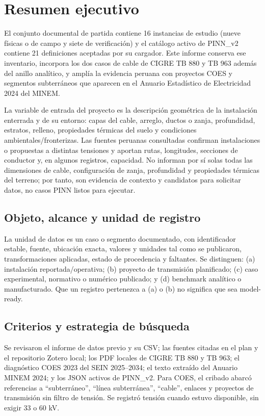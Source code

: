 \documentclass[11pt,a4paper,oneside]{report}
\begin{document}

\chapter*{Resumen ejecutivo}
El conjunto documental de partida contiene 16 instancias de estudio (nueve f\'isicas o de campo y siete de verificaci\'on) y el cat\'alogo activo de PINN\_v2 contiene 21 definiciones aceptadas por su cargador. Este informe conserva ese inventario, incorpora los dos casos de cable de CIGRE TB 880 y TB 963 adem\'as del anillo anal\'itico, y ampl\'ia la evidencia peruana con proyectos COES y segmentos subterr\'aneos que aparecen en el Anuario Estad\'istico de Electricidad 2024 del MINEM.

La variable de entrada del proyecto es la descripci\'on geom\'etrica de la instalaci\'on enterrada y de su entorno: capas del cable, arreglo, ductos o zanja, profundidad, estratos, relleno, propiedades t\'ermicas del suelo y condiciones ambientales/fronterizas. Las fuentes peruanas consultadas confirman instalaciones o propuestas a distintas tensiones y aportan rutas, longitudes, secciones de conductor y, en algunos registros, capacidad. No informan por s\'i solas todas las dimensiones de cable, configuraci\'on de zanja, profundidad y propiedades t\'ermicas del terreno; por tanto, son evidencia de contexto y candidatos para solicitar datos, no casos PINN listos para ejecutar.

\section*{Objeto, alcance y unidad de registro}
La unidad de datos es un caso o segmento documentado, con identificador estable, fuente, ubicaci\'on exacta, valores y unidades tal como se publicaron, transformaciones aplicadas, estado de procedencia y faltantes. Se distinguen: (a) instalaci\'on reportada/operativa; (b) proyecto de transmisi\'on planificado; (c) caso experimental, normativo o num\'erico publicado; y (d) benchmark anal\'itico o manufacturado. Que un registro pertenezca a (a) o (b) no significa que sea model-ready.

\section*{Criterios y estrategia de b\'usqueda}
Se revisaron el informe de datos previo y su CSV; las fuentes citadas en el plan y el repositorio Zotero local; los PDF locales de CIGRE TB 880 y TB 963; el diagn\'ostico COES 2023 del SEIN 2025--2034; el texto extra\'ido del Anuario MINEM 2024; y los JSON activos de PINN\_v2. Para COES, el cribado abarc\'o referencias a ``subterr\'aneo'', ``l\'inea subterr\'anea'', ``cable'', enlaces y proyectos de transmisi\'on sin filtro de tensi\'on. Se registr\'o tensi\'on cuando estuvo disponible, sin exigir 33 o 60 kV.
\end{document}
